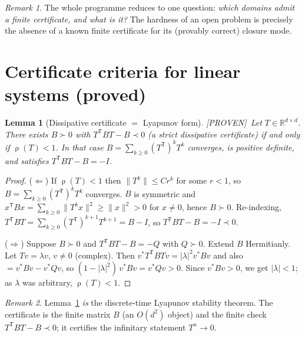 \documentclass[11pt]{article}
\theoremstyle{definition}
\theoremstyle{plain}
\newtheorem{lemma}{Lemma}
\theoremstyle{remark}
\newtheorem*{remark}{Remark}
\newcommand{\PROVEN}{\textcolor{green!45!black}{\textsf{[PROVEN]}}}
\newcommand{\T}{\mathsf{T}}
\newcommand{\trp}{^{\!\T}}
\DeclareMathOperator{\spr}{\rho}
\begin{document}
\begin{remark}
The whole programme reduces to one question: \emph{which domains admit a finite
certificate, and what is it?} The hardness of an open problem is precisely the absence
of a known finite certificate for its (provably correct) closure mode.
\end{remark}

\section{Certificate criteria for linear systems (proved)}

\begin{lemma}[Dissipative certificate $=$ Lyapunov form]\label{lem:diss}
\PROVEN\ Let $T\in\mathbb R^{d\times d}$. There exists $B\succ0$ with
$T\trp BT - B \prec 0$ (a strict dissipative certificate) \emph{if and only if}
$\spr(T)<1$. In that case $B=\sum_{k\ge0}(T\trp)^kT^k$ converges, is positive definite,
and satisfies $T\trp BT-B=-I$.
\end{lemma}
\begin{proof}
($\Leftarrow$) If $\spr(T)<1$ then $\|T^k\|\le Cr^k$ for some $r<1$, so
$B=\sum_{k\ge0}(T\trp)^kT^k$ converges. $B$ is symmetric and
$x\trp Bx=\sum_{k\ge0}\|T^kx\|^2\ge\|x\|^2>0$ for $x\neq0$, hence $B\succ0$.
Re-indexing, $T\trp BT=\sum_{k\ge0}(T\trp)^{k+1}T^{k+1}=B-I$, so
$T\trp BT-B=-I\prec0$.
\par
($\Rightarrow$) Suppose $B\succ0$ and $T\trp BT-B=-Q$ with $Q\succ0$. Extend $B$
Hermitianly. Let $Tv=\lambda v$, $v\neq0$ (complex). Then
$v^*T\trp BTv=|\lambda|^2 v^*Bv$ and also $=v^*Bv-v^*Qv$, so
$(1-|\lambda|^2)\,v^*Bv=v^*Qv>0$. Since $v^*Bv>0$, we get $|\lambda|<1$; as $\lambda$
was arbitrary, $\spr(T)<1$.
\end{proof}

\begin{remark}
Lemma~\ref{lem:diss} \emph{is} the discrete-time Lyapunov stability theorem. The
certificate is the finite matrix $B$ (an $O(d^2)$ object) and the finite check
$T\trp BT-B\prec0$; it certifies the infinitary statement $T^n\to0$.
\end{remark}
\end{document}
